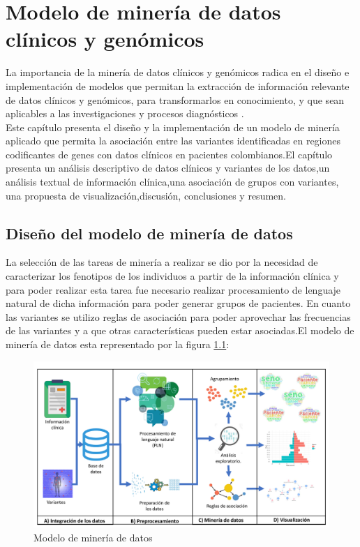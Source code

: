 \chapter{Modelo de minería de datos clínicos y genómicos}

La importancia de la minería de datos clínicos y genómicos radica en el diseño e implementación de modelos que permitan la extracción de información relevante de datos clínicos y genómicos, para transformarlos en conocimiento, y que sean aplicables a las investigaciones y procesos diagnósticos \cite{Farid2016}. \\  

Este capítulo presenta el diseño y la implementación de un modelo de minería aplicado que permita la asociación entre las variantes identificadas en regiones codificantes de genes con datos clínicos en pacientes colombianos.El capítulo presenta un análisis descriptivo de datos clínicos y variantes de los datos,un análisis textual de información clínica,una asociación de grupos con variantes, una propuesta de visualización,discusión, conclusiones y resumen. 

\section{Diseño del modelo de minería de datos}

La selección de las tareas de minería a realizar se dio por la necesidad de caracterizar los fenotipos de los individuos a partir de la información clínica y para poder realizar esta tarea fue necesario realizar procesamiento de lenguaje natural de dicha información para poder generar grupos de pacientes. En cuanto las variantes se utilizo reglas de asociación para poder aprovechar las frecuencias de las variantes y a que otras características pueden estar asociadas.El modelo de minería de datos esta representado por la figura  \ref{fig:kdd}:\\

\begin{figure}[]
	\centering
	\includegraphics[width=1\textwidth]{Kap4/KDDtesis.pdf}
	\caption{Modelo de minería de datos}
	\label{fig:kdd}
\end{figure}


